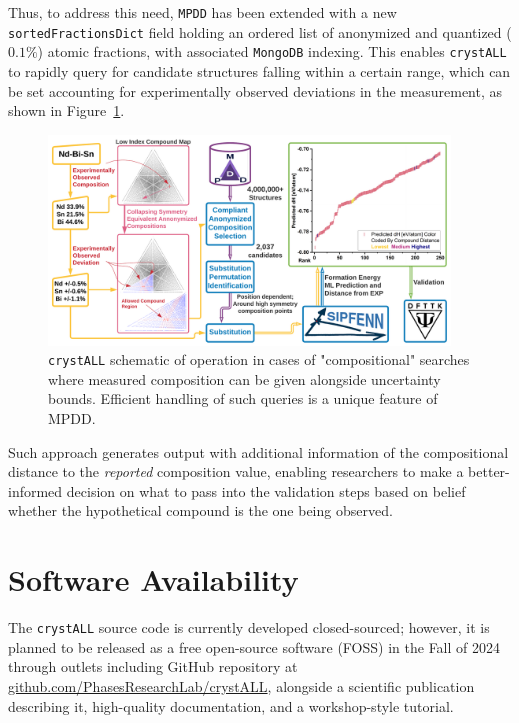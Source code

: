 Thus, to address this need, \texttt{MPDD} has been extended with a new \texttt{sortedFractionsDict} field holding an ordered list of anonymized and quantized ($0.1\%$) atomic fractions, with associated \texttt{MongoDB} indexing. This enables \texttt{crystALL} to rapidly query for candidate structures falling within a certain range, which can be set accounting for experimentally observed deviations in the measurement, as shown in Figure~\ref{fig:crystallcomposition}.

\begin{figure}[h]
    \centering
    \includegraphics[width=0.95\textwidth]{crystall/crystALL_composition_diagram_V3.png}
    \caption{\texttt{crystALL} schematic of operation in cases of "compositional" searches where measured composition can be given alongside uncertainty bounds. Efficient handling of such queries is a unique feature of MPDD.}
    \label{fig:crystallcomposition}
\end{figure}

Such approach generates output with additional information of the compositional distance to the \textit{reported} composition value, enabling researchers to make a better-informed decision on what to pass into the validation steps based on belief whether the hypothetical compound is the one being observed.

\section{Software Availability} \label{crystall:sec:softwareavaialbility}

The \texttt{crystALL} source code is currently developed closed-sourced; however, it is planned to be released as a free open-source software (FOSS) in the Fall of 2024 through outlets including GitHub repository at \href{https://github.com/PhasesResearchLab/crystALL}{github.com/PhasesResearchLab/crystALL}, alongside a scientific publication describing it, high-quality documentation, and a workshop-style tutorial.

% 

